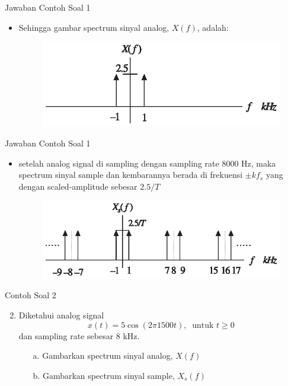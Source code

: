 \documentclass[pdflatex,compress,mathserif]{beamer}
\begin{document}
\begin{frame}{Jawaban Contoh Soal 1}
    \begin{itemize}
        \item Sehingga gambar spectrum sinyal analog, $X(f)$, adalah:
        \begin{figure}
            \includegraphics[width=\linewidth]{./img/img12}
        \end{figure}
    \end{itemize}
\end{frame}

\begin{frame}{Jawaban Contoh Soal 1}
    \begin{itemize}
        \item setelah analog signal di sampling dengan sampling rate 8000 Hz, maka spectrum sinyal sample dan kembarannya berada di frekuensi $\pm kf_s$ yang dengan scaled-amplitude sebesar $2.5/T$
        \begin{figure}
            \includegraphics[width=\linewidth]{./img/img13}
        \end{figure}
    \end{itemize}
\end{frame}

\begin{frame}{Contoh Soal 2}
    \begin{enumerate}
        \setcounter{enumi}{1}
        \item Diketahui analog signal
        \begin{equation*}
            x(t) = 5 \cos (2 \pi 1500 t),~\text{ untuk } t \geq 0
        \end{equation*}
        dan sampling rate sebesar 8 kHz.
        \begin{enumerate}
            \item[a.] Gambarkan spectrum sinyal analog, $X(f)$
            \item[b.] Gambarkan spectrum sinyal sample, $X_s(f)$
        \end{enumerate}
    \end{enumerate}
\end{frame}
\end{document}
